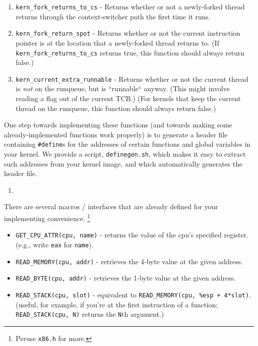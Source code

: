 \documentclass{article}
\begin{document}
\begin{enumerate}
	\item \texttt{kern\_fork\_returns\_to\_cs} - Returns whether or not a newly-forked thread returns through the context-switcher path the first time it runs.
	\item \texttt{kern\_fork\_return\_spot} - Returns whether or not the current instruction pointer is at the location that a newly-forked thread returns to. (If \texttt{kern\_fork\_returns\_to\_cs} returns true, this function should always return false.)
	\item \texttt{kern\_current\_extra\_runnable} - Returns whether or not the current thread is {\em not} on the runqueue, but is ``runnable`` anyway. (This might involve reading a flag out of the current TCB.) (For kernels that keep the current thread on the runqueue, this function should always return false.)
\end{enumerate}
One step towards implementing these functions (and towards making some already-implemented functions work properly) is to generate a header file containing \texttt{\#define}s for the addresses of certain functions and global variables in your kernel.
We provide a script, \texttt{definegen.sh}, which makes it easy to extract such addresses from your kernel image, and which automatically generates the header file.
\begin{enumerate}
	\item %
\end{enumerate}
There are several macros / interfaces that are already defined for your implementing convenience.
\footnote{Peruse \texttt{x86.h} for more.}
\begin{itemize}
	\item \texttt{GET\_CPU\_ATTR(cpu, name)} - returns the value of the cpu's specified register. (e.g., write \texttt{eax} for \texttt{name}).
	\item \texttt{READ\_MEMORY(cpu, addr)} - retrieves the 4-byte value at the given address.
	\item \texttt{READ\_BYTE(cpu, addr)} - retrieves the 1-byte value at the given address.
	\item \texttt{READ\_STACK(cpu, slot)} - equivalent to \texttt{READ\_MEMORY(cpu, \%esp + 4*slot)}.
		(useful, for example, if you're at the first instruction of a function; \texttt{READ\_STACK(cpu, N)} returns the \texttt{N}th argument.)
\end{itemize}
\end{document}
